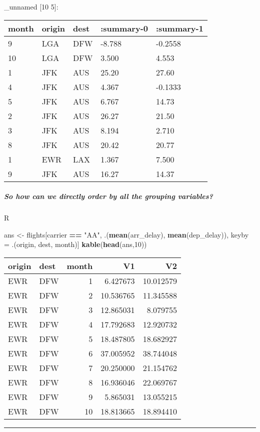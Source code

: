 \documentclass[]{article}
\newenvironment{Shaded}{\begin{snugshade}}{\end{snugshade}}
\newcommand{\KeywordTok}[1]{\textcolor[rgb]{0.13,0.29,0.53}{\textbf{#1}}}
\newcommand{\DecValTok}[1]{\textcolor[rgb]{0.00,0.00,0.81}{#1}}
\newcommand{\StringTok}[1]{\textcolor[rgb]{0.31,0.60,0.02}{#1}}
\newcommand{\OperatorTok}[1]{\textcolor[rgb]{0.81,0.36,0.00}{\textbf{#1}}}
\newcommand{\NormalTok}[1]{#1}
\let\oldsubparagraph\subparagraph
\renewcommand{\subparagraph}[1]{\oldsubparagraph{#1}\mbox{}}
\begin{document}
\_unnamed {[}10 5{]}:

\begin{longtable}[]{@{}lllll@{}}
\toprule
month & origin & dest & :summary-0 & :summary-1\tabularnewline
\midrule
\endhead
9 & LGA & DFW & -8.788 & -0.2558\tabularnewline
10 & LGA & DFW & 3.500 & 4.553\tabularnewline
1 & JFK & AUS & 25.20 & 27.60\tabularnewline
4 & JFK & AUS & 4.367 & -0.1333\tabularnewline
5 & JFK & AUS & 6.767 & 14.73\tabularnewline
2 & JFK & AUS & 26.27 & 21.50\tabularnewline
3 & JFK & AUS & 8.194 & 2.710\tabularnewline
8 & JFK & AUS & 20.42 & 20.77\tabularnewline
1 & EWR & LAX & 1.367 & 7.500\tabularnewline
9 & JFK & AUS & 16.27 & 14.37\tabularnewline
\bottomrule
\end{longtable}

\subparagraph{So how can we directly order by all the grouping
variables?}\label{so-how-can-we-directly-order-by-all-the-grouping-variables}

R

\begin{Shaded}
\begin{Highlighting}[]
\NormalTok{ans <-}\StringTok{ }\NormalTok{flights[carrier }\OperatorTok{==}\StringTok{ "AA"}\NormalTok{,}
\NormalTok{        .(}\KeywordTok{mean}\NormalTok{(arr_delay), }\KeywordTok{mean}\NormalTok{(dep_delay)),}
\NormalTok{        keyby =}\StringTok{ }\NormalTok{.(origin, dest, month)]}
\KeywordTok{kable}\NormalTok{(}\KeywordTok{head}\NormalTok{(ans,}\DecValTok{10}\NormalTok{))}
\end{Highlighting}
\end{Shaded}

\begin{longtable}[]{@{}llrrr@{}}
\toprule
origin & dest & month & V1 & V2\tabularnewline
\midrule
\endhead
EWR & DFW & 1 & 6.427673 & 10.012579\tabularnewline
EWR & DFW & 2 & 10.536765 & 11.345588\tabularnewline
EWR & DFW & 3 & 12.865031 & 8.079755\tabularnewline
EWR & DFW & 4 & 17.792683 & 12.920732\tabularnewline
EWR & DFW & 5 & 18.487805 & 18.682927\tabularnewline
EWR & DFW & 6 & 37.005952 & 38.744048\tabularnewline
EWR & DFW & 7 & 20.250000 & 21.154762\tabularnewline
EWR & DFW & 8 & 16.936046 & 22.069767\tabularnewline
EWR & DFW & 9 & 5.865031 & 13.055215\tabularnewline
EWR & DFW & 10 & 18.813665 & 18.894410\tabularnewline
\bottomrule
\end{longtable}

\begin{center}\rule{0.5\linewidth}{0.5pt}\end{center}
\end{document}
